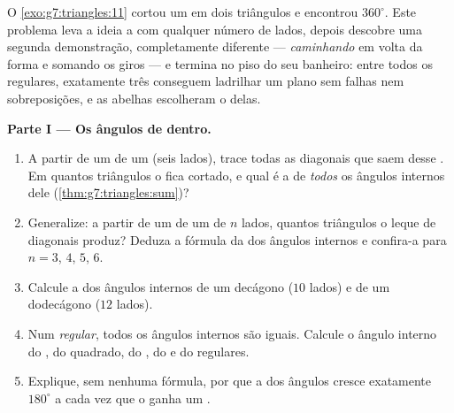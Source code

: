 \begin{problem}
\label{pb:g7:triangles:1}
O \cref{exo:g7:triangles:11} cortou um  em dois triângulos
e encontrou $360^\circ$. Este problema leva a ideia a  com
qualquer número de lados, depois descobre uma segunda demonstração,
completamente diferente --- \emph{caminhando} em volta da forma e
somando os giros --- e termina no piso do seu banheiro: entre todos os
 regulares, exatamente três conseguem ladrilhar um plano sem
falhas nem sobreposições, e as abelhas escolheram o delas.

\medskip
\noindent\textbf{Parte I --- Os ângulos de dentro.}
\begin{enumerate}
  \item A partir de um  de um  (seis lados), trace todas
        as diagonais que saem desse . Em quantos triângulos o
         fica cortado, e qual é a  de \emph{todos} os
        ângulos internos dele (\cref{thm:g7:triangles:sum})?
  \item Generalize: a partir de um  de um  de $n$ lados,
        quantos triângulos o leque de diagonais produz? Deduza a
        fórmula da  dos ângulos internos e confira-a para $n = 3$,
        $4$, $5$, $6$.
  \item Calcule a  dos ângulos internos de um decágono ($10$ lados)
        e de um dodecágono ($12$ lados).
  \item Num  \emph{regular}, todos os ângulos internos são
        iguais. Calcule o ângulo interno do , do
        quadrado, do , do  e do  regulares.
  \item Explique, sem nenhuma fórmula, por que a  dos ângulos
        cresce exatamente $180^\circ$ a cada vez que o  ganha
        um .
\end{enumerate}


\end{problem}

